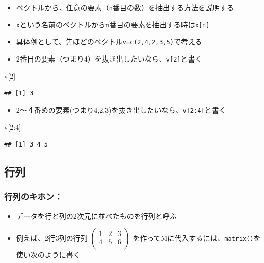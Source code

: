 \documentclass[
]{book}
\newenvironment{Shaded}{\begin{snugshade}}{\end{snugshade}}
\newcommand{\DecValTok}[1]{\textcolor[rgb]{0.00,0.00,0.81}{#1}}
\newcommand{\NormalTok}[1]{#1}
\newcommand{\SpecialCharTok}[1]{\textcolor[rgb]{0.00,0.00,0.00}{#1}}
\providecommand{\tightlist}{%
  \setlength{\itemsep}{0pt}\setlength{\parskip}{0pt}}
\begin{document}
\begin{itemize}
\tightlist
\item
  ベクトルから、任意の要素（\texttt{n}番目の数）を抽出する方法を説明する
\item
  \texttt{x}という名前のベクトルからn番目の要素を抽出する時は\texttt{x{[}n{]}}
\item
  具体例として、先ほどのベクトル\texttt{v=c(2,4,2,3,5)}で考える
\item
  2番目の要素（つまり4）を抜き出したいなら、\texttt{v{[}2{]}}と書く
\end{itemize}

\begin{Shaded}
\begin{Highlighting}[]
\NormalTok{v[}\DecValTok{2}\NormalTok{]}
\end{Highlighting}
\end{Shaded}

\begin{verbatim}
## [1] 3
\end{verbatim}

\begin{itemize}
\tightlist
\item
  2〜４番めの要素(つまり4,2,3)を抜き出したいなら、\texttt{v{[}2:4{]}}と書く
\end{itemize}

\begin{Shaded}
\begin{Highlighting}[]
\NormalTok{v[}\DecValTok{2}\SpecialCharTok{:}\DecValTok{4}\NormalTok{]}
\end{Highlighting}
\end{Shaded}

\begin{verbatim}
## [1] 3 4 5
\end{verbatim}

\hypertarget{ux884cux5217}{%
\subsection{行列}\label{ux884cux5217}}

\hypertarget{ux884cux5217ux306eux30adux30dbux30f3}{%
\subsubsection*{行列のキホン：}\label{ux884cux5217ux306eux30adux30dbux30f3}}

\begin{itemize}
\tightlist
\item
  データを行と列の2次元に並べたものを行列と呼ぶ
\item
  例えば、2行3列の行列
  \(\begin{pmatrix} 1 & 2 & 3 \\ 4 & 5 & 6 \\ \end{pmatrix}\)
  を作ってMに代入するには、\texttt{matrix()}を使い次のように書く
\end{itemize}
\end{document}
